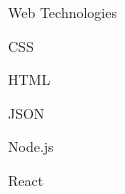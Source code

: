 \begin{skillset}{Web Technologies}
  \item CSS
  \item HTML
  \item JSON
  \item Node.js
  \item React
\end{skillset}
